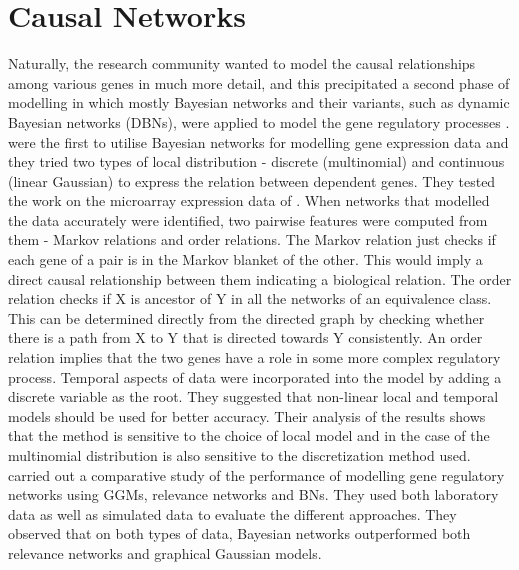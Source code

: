 \section{Causal Networks} 
Naturally, the research community wanted to model the causal relationships among various genes in much more detail, and this precipitated a second phase of modelling in which mostly Bayesian networks and their variants, such as dynamic Bayesian networks (DBNs), were applied to model the gene regulatory processes \citep{friedman00using,husmeier03sensitivity,murphy99modelling,zou05dynamic}. \citet{friedman00using} were the first to utilise Bayesian networks for modelling gene expression data and they tried two types of local distribution - discrete (multinomial) and continuous (linear Gaussian) to express the relation between dependent genes. They tested the work on the microarray expression data of \citet{spellman98comprehensive}. When networks that modelled the data accurately were identified, two pairwise features were computed from them - Markov relations and order relations. The Markov relation just checks if each gene of a pair is in the Markov blanket of the other. This would imply a direct causal relationship between them indicating a biological relation. The order relation checks if X is ancestor of Y in all the networks of an equivalence class. This can be determined directly from the directed graph by checking whether there is a path from X to Y that is directed towards Y consistently. An order relation implies that the two genes have a role in some more complex regulatory process. Temporal aspects of data were incorporated into the model by adding a discrete variable as the root. They suggested that non-linear local and temporal models should be used for better accuracy. Their analysis of the results shows that the method is sensitive to the choice of local model and in the case of the multinomial distribution is also sensitive to the discretization method used. \citet{werhli06comparative} carried out a comparative study of the performance of modelling gene regulatory networks using \acp{GGM}, relevance networks and \acp{BN}. They used both laboratory data as well as simulated data to evaluate the different approaches. They observed that on both types of data, Bayesian networks outperformed both relevance networks and graphical Gaussian models. 

